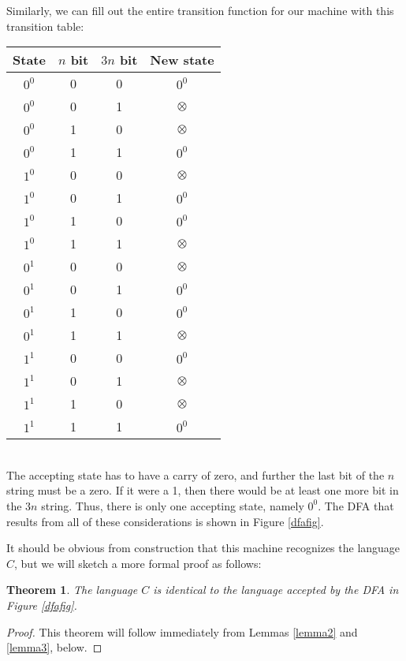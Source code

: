 \documentclass{article}
\newtheorem{theorem}{Theorem}
\begin{document}
\begin{enumerate}
  Similarly,  we can fill out the entire
  transition function for our machine with this transition table:
  \\
  \begin{tabular}{cccc}
    State & $n$ bit & $3n$ bit & New state\\\hline
    $0^0$ & 0 & 0 & $0^0$\\
    $0^0$ & 0 & 1 & $\otimes$\\
    $0^0$ & 1 & 0 & $\otimes$\\
    $0^0$ & 1 & 1 & $0^0$\\\hline
    $1^0$ & 0 & 0 & $\otimes$\\
    $1^0$ & 0 & 1 & $0^0$\\
    $1^0$ & 1 & 0 & $0^0$\\
    $1^0$ & 1 & 1 & $\otimes$\\\hline
    $0^1$ & 0 & 0 & $\otimes$\\
    $0^1$ & 0 & 1 & $0^0$\\
    $0^1$ & 1 & 0 & $0^0$\\
    $0^1$ & 1 & 1 & $\otimes$\\\hline
    $1^1$ & 0 & 0 & $0^0$\\
    $1^1$ & 0 & 1 & $\otimes$\\
    $1^1$ & 1 & 0 & $\otimes$\\
    $1^1$ & 1 & 1 & $0^0$\\\hline
  \end{tabular}\\
  The accepting state has to have a carry of zero, and further the
  last bit of the $n$ string  must be a zero. If it were a 1, then
  there would be at least one more bit in the $3n$ string.  Thus,
  there is only one accepting state, namely $0^0$.
  The DFA that results from all of these considerations
  is shown in Figure \ref{dfafig}.

  It should be obvious from construction that this machine recognizes
  the language $C$, but we will sketch a more formal proof as follows:

  \begin{theorem} The language $C$ is identical to the language
    accepted by the DFA in Figure \ref{dfafig}.
  \end{theorem}
  \begin{proof}
This theorem will follow immediately from Lemmas \ref{lemma2} and
\ref{lemma3}, below.
    \end{proof}


\end{enumerate}
\end{document}

